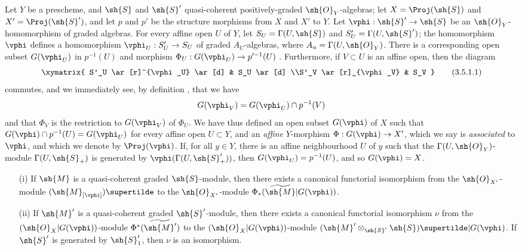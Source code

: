 \begin{env}[3.5.1]
\label{II.3.5.1}
Let $Y$ be a prescheme, and $\sh{S}$ and $\sh{S}'$ quasi-coherent positively-graded $\sh{O}_Y$-algebras;
let $X=\Proj(\sh{S})$ and $X'=\Proj(\sh{S}')$, and let $p$ and $p'$ be the structure morphisms from $X$ and $X'$ to $Y$.
Let $\vphi:\sh{S}'\to\sh{S}$ be an $\sh{O}_Y$-homomorphism of graded algebras.
For every affine open $U$ of $Y$, let $S_U=\Gamma(U,\sh{S})$ and $S'_U=\Gamma(U,\sh{S}')$;
the homomorphism $\vphi$ defines a homomorphism $\vphi_U:S'_U\to S_U$ of graded $A_U$-algebras, where $A_u=\Gamma(U,\sh{O}_Y)$.
There is a corresponding open subset $G(\vphi_U)$ in $p^{-1}(U)$ and morphism $\Phi_U:G(\vphi_U)\to p'^{-1}(U)$ .
Furthermore, if $V\subset U$ is an affine open, then the diagram
\[
\label{II.3.5.1.1}
  \xymatrix{
    S'_U \ar[r]^{\vphi_U} \ar[d]
    & S_U \ar[d]
  \\S'_V \ar[r]_{\vphi_V}
    & S_V
  }
\tag{3.5.1.1}
\]
commutes, and we immediately see, by definition , that we have
\[
  G(\vphi_V) = G(\vphi_U)\cap p^{-1}(V)
\]
and that $\Phi_V$ is the restriction  to $G(\vphi_V)$ of $\Phi_U$.
We have thus defined an open subset $G(\vphi)$ of $X$ such that $G(\vphi)\cap p^{-1}(U)=G(\vphi_U)$ for every affine open $U\subset Y$, and an \emph{affine} $Y$-morphism $\Phi:G(\vphi)\to X'$, which we say is \emph{associated} to $\vphi$, and which we denote by $\Proj(\vphi)$.
If, for all $y\in Y$, there is an affine neighbourhood $U$ of $y$ such that the $\Gamma(U,\sh{O}_Y)$-module $\Gamma(U,\sh{S}_+)$ is generated by $\vphi(\Gamma(U,\sh{S}'_+))$, then $G(\vphi_U)=p^{-1}(U)$, and so $G(\vphi)=X$.
\end{env}

\begin{proposition}[3.5.2]
\label{II.3.5.2}
\medskip\noindent
\begin{enumerate}
  \item[(i)] If $\sh{M}$ is a quasi-coherent graded $\sh{S}$-module, then there exists a canonical functorial isomorphism from the $\sh{O}_{X'}$-module $(\sh{M}_{[\vphi]})\supertilde$ to the $\sh{O}_{X'}$-module $\Phi_*(\widetilde{\sh{M}}|G(\vphi))$.
  \item[(ii)] If $\sh{M}'$ is a quasi-coherent graded $\sh{S}'$-module, then there exists a canonical functorial isomorphism $\nu$ from the $(\sh{O}_X|G(\vphi))$-module $\Phi^*(\widetilde{\sh{M}'})$ to the $(\sh{O}_X|G(\vphi))$-module $(\sh{M}'\otimes_{\sh{S}'}\sh{S})\supertilde|G(\vphi)$.
    If $\sh{S}'$ is generated by $\sh{S}'_1$, then $\nu$ is an isomorphism.
\end{enumerate}
\end{proposition}

